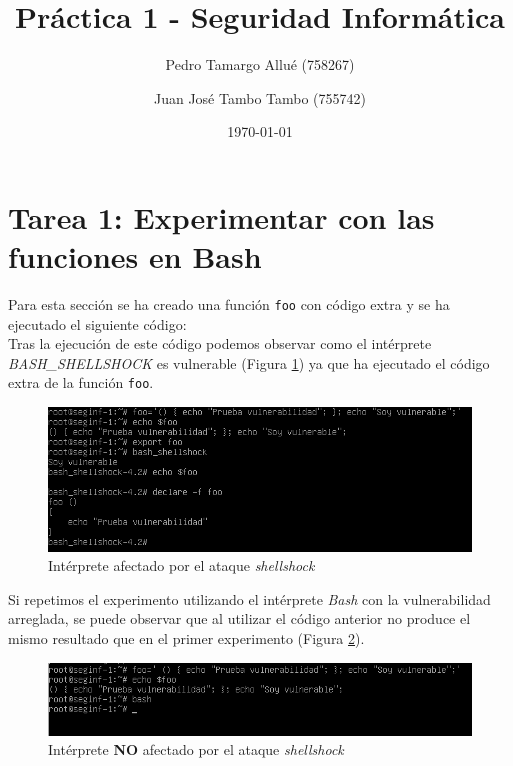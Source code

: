 \documentclass[10pt,a4paper]{article}
\begin{document}
\begin{titlepage}
\title{{\Huge \textbf{Práctica 1 - Seguridad Informática}}}
\author{Pedro Tamargo Allué (758267) \and Juan José Tambo Tambo (755742)}
\date{\today}
\clearpage\maketitle
\thispagestyle{empty}
\tableofcontents
\listoffigures
\end{titlepage}

\section{Tarea 1: Experimentar con las funciones en Bash}

Para esta sección se ha creado una función \texttt{foo} con código extra y se ha ejecutado el siguiente código:\\



Tras la ejecución de este código podemos observar como el intérprete \emph{BASH\_{}SHELLSHOCK} es vulnerable (Figura \ref{fig:tarea1_shellshock}) ya que ha ejecutado el código extra de la función \texttt{foo}.

\begin{figure}[h!]
\centering
\includegraphics[scale=0.6]{images/Tarea_1.png}
\caption{Intérprete afectado por el ataque \emph{shellshock}}
\label{fig:tarea1_shellshock} 
\end{figure}

Si repetimos el experimento utilizando el intérprete \emph{Bash} con la vulnerabilidad arreglada, se puede observar que al utilizar el código anterior no produce el mismo resultado que en el primer experimento (Figura \ref{fig:tarea1_bash_normal}).

\begin{figure}[h!]
\centering
\includegraphics[scale=0.6]{images/Tarea_1b.png}
\caption{Intérprete \textbf{NO} afectado por el ataque \emph{shellshock}}
\label{fig:tarea1_bash_normal} 
\end{figure}
\end{document}
